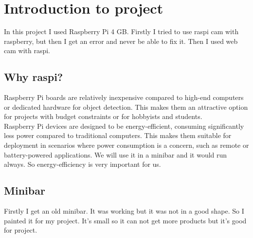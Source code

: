 \chapter{Introduction to project}
In this project I used Raspberry Pi 4 GB. Firstly I tried to use raspi cam with raspberry, but then I get an error and never be able to fix it. Then I used web cam with raspi.

\section{Why raspi?}
Raspberry Pi boards are relatively inexpensive compared to high-end computers or dedicated hardware for object detection. This makes them an attractive option for projects with budget constraints or for hobbyists and students.\\
Raspberry Pi devices are designed to be energy-efficient, consuming significantly less power compared to traditional computers. This makes them suitable for deployment in scenarios where power consumption is a concern, such as remote or battery-powered applications. We will use it in a minibar and it would run always.
So energy-efficiency is very important for us.


\section{Minibar}
Firstly I get an old minibar. It was working but it was not in a good shape. So I painted it for my project.
It's small so it can not get more products but it's good for project.

